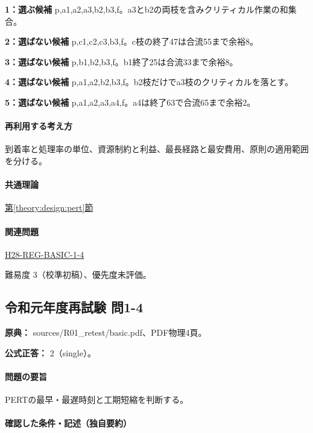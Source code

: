 \noindent\textbf{1：選ぶ候補} p,a1,a2,a3,b2,b3,f。a3とb2の両枝を含みクリティカル作業の和集合。\par

\noindent\textbf{2：選ばない候補} p,c1,c2,c3,b3,f。c枝の終了47は合流55まで余裕8。\par

\noindent\textbf{3：選ばない候補} p,b1,b2,b3,f。b1終了25は合流33まで余裕8。\par

\noindent\textbf{4：選ばない候補} p,a1,a2,b2,b3,f。b2枝だけでa3枝のクリティカルを落とす。\par

\noindent\textbf{5：選ばない候補} p,a1,a2,a3,a4,f。a4は終了63で合流65まで余裕2。\par

\paragraph{再利用する考え方} 到着率と処理率の単位、資源制約と利益、最長経路と最安費用、原則の適用範囲を分ける。

\paragraph{共通理論} \hyperref[theory:design:pert]{第\ref*{theory:design:pert}節}

\paragraph{関連問題} \hyperref[q:h28-reg-basic-1-4]{H28-REG-BASIC-1-4}

\par 難易度 3（校準初稿）、優先度未評価。

\subsection{令和元年度再試験 問1-4}
\label{q:r01-ret-basic-1-4}

\noindent\textbf{原典：} sources/R01\_retest/basic.pdf、PDF物理4頁。

\textbf{公式正答：} 2（single）。

\paragraph{問題の要旨} PERTの最早・最遅時刻と工期短縮を判断する。

\paragraph{確認した条件・記述（独自要約）}\mbox{}\par


